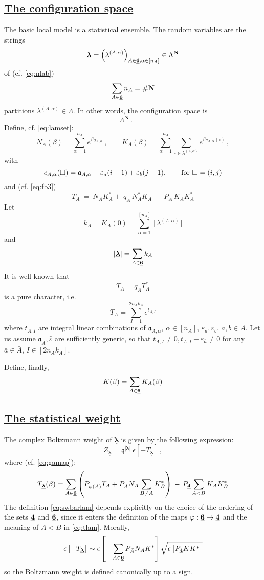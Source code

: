 \documentclass[12pt]{amsart}
\newcommand {\3}{\underline{\bf 3}}
\newcommand {\4}{\underline{\bf 4}}
\newcommand {\6}{\underline{\bf 6}}
\newcommand{\beq}{\begin{equation}}
\newcommand{\eeq}{\end{equation}}
\newcommand {\bN}   {\mathbf{N}}
\newcommand {\qe} {\mathfrak q}
\newcommand {\ba}  {\underline{\ac}}
\newcommand {\bla} {\underline{\boldsymbol{\lambda}}}
\newcommand {\ac} {\mathfrak{a}}
\newcommand{\ve}{\varepsilon}
\newcommand{\ep}{\epsilon}
\newcommand{\subsec}[1]{\subsection{\underline{\bf #1}}}
\begin{document}
\subsec{The configuration space}
The basic local model is a statistical ensemble. The random variables are the strings 
\beq
{\bla} = \left( {\lambda}^{(A, {\alpha})} \right)_{A \in {\6}, {\alpha} \in [n_{A}]} \in {\Lambda}^{{\bN}}
\label{eq:blabulk}
\eeq  of (cf. \eqref{eq:nlab})
$$
\sum_{A \in {\6}} n_{A} = {\#}{\bN}
$$
partitions ${\lambda}^{(A, \alpha)} \in {\Lambda}$.
In other words, the configuration space
is 
\beq
{\Lambda}^{{\bN}}
\, . \qquad 
\label{eq:confbulk}
\eeq
Define, cf. \eqref{eq:lamset}:
\beq
N_{A}({\beta}) = \sum_{{\alpha}=1}^{n_{A}} e^{{\beta}{\ac}_{A, \alpha}}
\, , \qquad 
K_{A} ({\beta}) = \sum_{{\alpha}=1}^{n_{A}} \sum_{{\square} \in {\lambda}^{(A, \alpha)}} e^{{\beta}c_{A, \alpha}({\square})} \, , \eeq
with
\beq
c_{A, \alpha}({\square}) = {\ac}_{A, \alpha} + {\ve}_{a} ( i - 1) + {\ve}_{b} (j-1), \qquad {\rm for} \ {\square} = (i,j) \label{eq:cont}
\eeq
and  (cf. \eqref{eq:fb3})
\beq
T_{A} \ = \ N_{A} K_{A}^{*} + \ q_{A}\, N_{A}^{*} K_{A} \ -\  P_{A}\, K_{A}K_{A}^{*}
\label{eq:tanchar}
\eeq
Let
\beq
k_{A} = K_{A}(0) = \sum_{{\alpha}=1}^{[n_{A}]} \ \vert \, {\lambda}^{(A, {\alpha})} \, \vert
\label{eq:instcha}
\eeq
and
\beq
| {\bla} | = \sum_{A \in \6} k_{A}
\eeq
It is well-known \cite{Nekrasov:2002qd, Nakajima:2003lectures, Alday:2009aq} that 
\beq
T_{A} = q_{A}T_{A}^{*}
\label{eq:sympl}
\eeq 
is a pure character, i.e. 
\beq
T_{A} = \sum_{I=1}^{2n_{A}k_{A}} e^{t_{A,I}}
\label{eq:tanchar2}
\eeq
where $t_{A,I}$ are integral linear combinations of ${\ac}_{A, \alpha}$, 
${\alpha} \in [n_{A}]$, 
${\ve}_{a}, {\ve}_{b}$, $a,b \in A$. Let us assume ${\ba}_{A}, {\bar\ve}$ are
sufficiently generic, so that $t_{A, I} \neq 0, t_{A,I} + {\ve}_{\bar a}  \neq 0$ for any ${\bar a} \in {\bar A}$, $I \in [2n_{A}k_{A}]$. 


Define, finally,
\beq
K({\beta}) = \sum_{A \in \6} K_{A}({\beta})
\label{eq:ktot}
\eeq
 


\subsec{The statistical weight}

The complex Boltzmann weight of $\bla$ is given by the following expression:
\beq
Z_{\bla} = {\qe}^{|{\bla}|}\  {\ep} \left[ -T_{\bla} \right] \, , 
\label{eq:swbarlam}
\eeq
where (cf. \eqref{eq:gamap}):
\beq
T_{\bla} ({\beta})=  \sum_{A \in {\6}}   \left( P_{{\varphi}({\bar A})}T_{A} + 
P_{\bar A}  N_{A} \sum_{B\neq A} K_{B}^{*} \right) \, - \, P_{\4} \sum_{A < B} K_{A}K_{B}^{*}
\label{eq:tlam}
\eeq
The definition \eqref{eq:swbarlam} depends explicitly on the choice of the ordering of the sets $\4$ and $\6$, since it enters the definition of the maps ${\varphi}: {\6} \to {\4}$ and the meaning of $A < B$ in \eqref{eq:tlam}. Morally, 
\beq
 {\ep} \left[ -T_{\bla} \right] \sim {\ep} \left[ - \sum_{A \in \6} P_{\bar A}N_{A} K^{*} \right]
 \sqrt{{\ep} \left[ P_{\4} K K ^{*} \right]}
 \eeq
so the Boltzmann weight is defined canonically up to a sign. 
\end{document}
